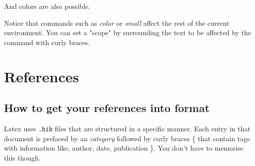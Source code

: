 \documentclass[12pt]{scrarticle}
\begin{document}
And {\color{blue}colors} {\color{red} are} {\color{cyan} also} possible.

Notice that commands such as \textit{color} or \textit{small} affect the rest of the current environment. You can set a "scope" by surrounding the text to be affected by the command with curly braces.

\section{References}

\subsection{How to get your references into format}
Latex uses \texttt{.bib} files that are structured in a specific manner. Each entry in that document is prefaced by an \@\textit{category} followed by curly braces \{ that contain tags with information like, author, date, publication \}. You don't have to memorise this though.
\end{document}
